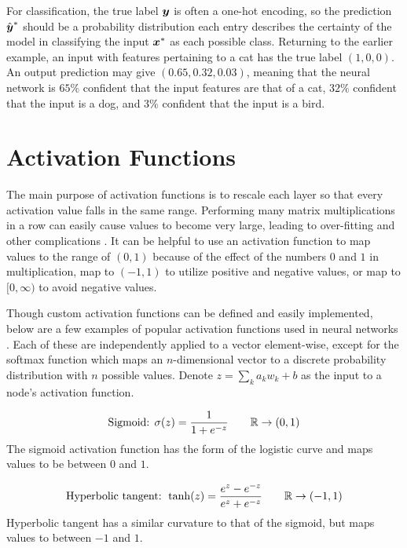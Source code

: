 For classification, the true label $\boldsymbol{y}$ is often a one-hot encoding, so the prediction $\hat{\boldsymbol{y}}^*$ should be a probability distribution each entry describes the certainty of the model in classifying the input $\boldsymbol{x}^*$ as each possible class. Returning to the earlier example, an input with features pertaining to a cat has the true label $(1,0,0)$. An output prediction may give $(0.65, 0.32, 0.03)$, meaning that the neural network is $65\%$ confident that the input features are that of a cat, $32\%$ confident that the input is a dog, and $3\%$ confident that the input is a bird.

\section{Activation Functions} \label{apdx:activation_fcns}
The main purpose of activation functions is to rescale each layer so that every activation value falls in the same range. Performing many matrix multiplications in a row can easily cause values to become very large, leading to over-fitting and other complications \cite{sibi2013}. It can be helpful to use an activation function to map values to the range of $(0,1)$ because of the effect of the numbers $0$ and $1$ in multiplication, map to $(-1,1)$ to utilize positive and negative values, or map to $[0,\infty)$ to avoid negative values. 

Though custom activation functions can be defined and easily implemented, below are a few examples of popular activation functions used in neural networks \cite{tensorflow} \cite{keras_r}. Each of these are independently applied to a vector element-wise, except for the softmax function which maps an $n$-dimensional vector to a discrete probability distribution with $n$ possible values. Denote $z = \sum_k a_k w_k + b$ as the input to a node's activation function.

\begin{equation}
  \text{Sigmoid: } \sigma(z) = \frac{1}{1 + e^{-z}} \quad \quad \mathbb{R} \to (0,1) 
  \label{eq:sigmoid_eqn}
\end{equation}
The sigmoid activation function has the form of the logistic curve and maps values to be between $0$ and $1$.

\begin{equation}
  \text{Hyperbolic tangent: } \tanh(z) = \frac{e^z - e^{-z}}{e^z + e^{-z}} \quad \quad \mathbb{R} \to (-1,1)
  \label{eq:tanh_eqn}
\end{equation}
Hyperbolic tangent has a similar curvature to that of the sigmoid, but maps values to between $-1$ and $1$. 

